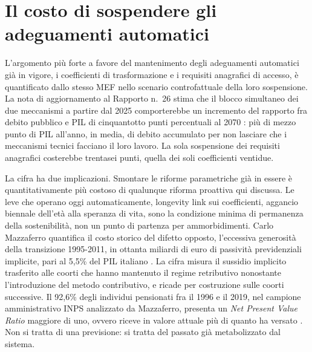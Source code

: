 \section{Il costo di sospendere gli adeguamenti automatici}
\label{sec:nonriformare}

\noindent
L'argomento più forte a favore del mantenimento degli adeguamenti automatici
già in vigore, i coefficienti di trasformazione e i requisiti anagrafici di
accesso, è quantificato dallo stesso MEF nello scenario controfattuale della
loro sospensione. La nota
di aggiornamento al Rapporto n.~26 stima che il blocco simultaneo dei due
meccanismi a partire dal 2025 comporterebbe un incremento del rapporto fra
debito pubblico e PIL di cinquantotto punti percentuali al 2070
\cite{MEF_RGS2025_NdA}: più di mezzo punto di PIL all'anno, in media, di
debito accumulato per non lasciare che i meccanismi tecnici facciano il loro
lavoro. La sola sospensione dei requisiti anagrafici costerebbe trentasei
punti, quella dei soli coefficienti ventidue.

\medskip
\noindent
La cifra ha due implicazioni. Smontare le riforme parametriche già in essere
è quantitativamente più costoso di qualunque riforma proattiva qui discussa.
Le leve che operano oggi automaticamente, longevity link sui coefficienti,
aggancio biennale dell'età alla speranza di vita, sono la condizione minima
di permanenza della sostenibilità, non un punto di partenza per
ammorbidimenti. Carlo Mazzaferro quantifica il costo storico del difetto
opposto, l'eccessiva generosità della transizione 1995-2011, in ottanta
miliardi di euro di passività previdenziali implicite, pari al 5,5\% del PIL
italiano \cite{Mazzaferro2023}. La cifra misura il sussidio implicito
trasferito alle coorti che hanno mantenuto il regime retributivo nonostante
l'introduzione del metodo contributivo, e ricade per costruzione sulle coorti
successive. Il 92,6\% degli individui pensionati fra il 1996 e il 2019, nel
campione amministrativo INPS analizzato da Mazzaferro, presenta un \emph{Net
Present Value Ratio} maggiore di uno, ovvero riceve in valore attuale più di
quanto ha versato \cite{Mazzaferro2023}. Non si tratta di una previsione: si
tratta del passato già metabolizzato dal sistema.


